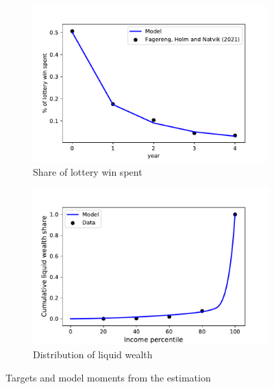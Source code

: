 \documentclass[11pt]{article}
\begin{document}
\begin{figure}[htb]
	\centering
	\begin{subfigure}[b]{.48\linewidth}
	\centering
	\includegraphics[width=\linewidth]{../Code/HA-Models/Target_AggMPCX_LiquWealth/Figures/AggMPC_LotteryWin}
	\caption{Share of lottery win spent}
	\label{fig:aggmpclotterywin}
	\end{subfigure}
	\begin{subfigure}[b]{.48\linewidth}
		\centering
		\includegraphics[width=\linewidth]{../Code/HA-Models/Target_AggMPCX_LiquWealth/Figures/LiquWealth_Distribution}
		\caption{Distribution of liquid wealth}
		\label{fig:liquwealthdistribution}
	\end{subfigure}%
	\caption{Targets and model moments from the estimation}
	\label{fig:splurge_estimation}
\end{figure}
\end{document}
